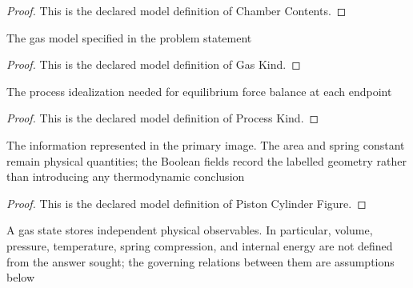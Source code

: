 \begin{proof}
  This is the declared model definition of Chamber Contents.
\end{proof}
\begin{definition}
  \label{def:physics:phyx-mini-0416:phyxminiproblems-problemphyxmini0416-gaskind}
  The gas model specified in the problem statement
\end{definition}
\begin{proof}
  This is the declared model definition of Gas Kind.
\end{proof}
\begin{definition}
  \label{def:physics:phyx-mini-0416:phyxminiproblems-problemphyxmini0416-processkind}
  The process idealization needed for equilibrium force balance at each endpoint
\end{definition}
\begin{proof}
  This is the declared model definition of Process Kind.
\end{proof}
\begin{definition}
  \label{def:physics:phyx-mini-0416:phyxminiproblems-problemphyxmini0416-pistoncylinderfigure}
  The information represented in the primary image. The area and spring constant remain physical quantities; the Boolean fields record the labelled geometry rather than introducing any thermodynamic conclusion
\end{definition}
\begin{proof}
  This is the declared model definition of Piston Cylinder Figure.
\end{proof}
\begin{definition}
  \label{def:physics:phyx-mini-0416:phyxminiproblems-problemphyxmini0416-monatomicgasstate}
  A gas state stores independent physical observables. In particular, volume, pressure, temperature, spring compression, and internal energy are not defined from the answer sought; the governing relations between them are assumptions below
\end{definition}

